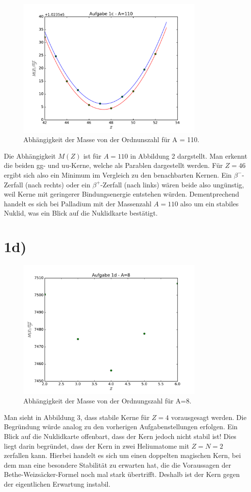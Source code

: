 \begin{figure}
  \centering
  \label{fig:2}
  \includegraphics[height=7cm]{1c.pdf}
  \caption{Abhängigkeit der Masse von der Ordnunszahl für A = 110.}
\end{figure}
Die Abhängigkeit $M(Z)$ ist für $A=110$ in Abbildung 2 dargstellt. Man erkennt die beiden gg- und uu-Kerne, welche als Parablen dargestellt werden.
Für $Z=46$ ergibt sich also ein Minimum im Vergleich zu den benachbarten Kernen. Ein $\beta^{-}$-Zerfall (nach rechts) oder ein $\beta^{+}$-Zerfall (nach links) wären beide also ungünstig, weil Kerne mit geringerer Bindungsenergie entstehen würden. Dementprechend handelt es sich bei Palladium mit der Massenzahl $A=110$ also um ein stabiles Nuklid, was ein Blick auf die Nuklidkarte bestätigt.

\section{1d)}
\begin{figure}
  \centering
  \label{fig:3}
  \includegraphics[height=7cm]{1d.pdf}
  \caption{Abhängigkeit der Masse von der Ordnungszahl für A=8.}
\end{figure}
Man sieht in Abbildung 3, dass stabile Kerne für $Z=4$ vorausgesagt werden. Die Begründung würde analog zu den vorherigen Aufgabenstellungen erfolgen. Ein Blick auf die Nuklidkarte offenbart, dass der Kern jedoch nicht stabil ist!
Dies liegt darin begründet, dass der Kern in zwei Heliumatome mit $Z=N=2$ zerfallen kann. Hierbei handelt es sich um einen doppelten magischen Kern, bei dem man eine besondere Stabilität zu erwarten hat, die die Voraussagen der Bethe-Weizsäcker-Formel noch mal stark übertrifft.
Deshalb ist der Kern gegen der eigentlichen Erwartung instabil.





